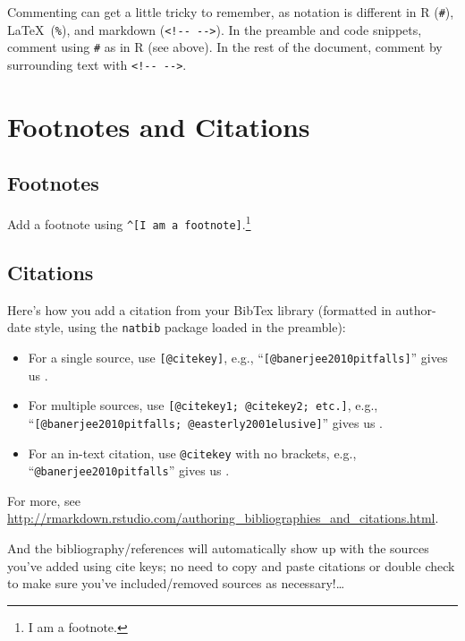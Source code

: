\documentclass[11pt,]{article}
\providecommand{\tightlist}{%
  \setlength{\itemsep}{0pt}\setlength{\parskip}{0pt}}
\let\rmarkdownfootnote\footnote%
\def\footnote{\protect\rmarkdownfootnote}
\begin{document}
Commenting can get a little tricky to remember, as notation is different
in R (\texttt{\#}), \LaTeX~(\texttt{\%}), and markdown
(\texttt{\textless{}!-\/-\ -\/-\textgreater{}}). In the preamble and
code snippets, comment using \texttt{\#} as in R (see above). In the
rest of the document, comment by surrounding text with
\texttt{\textless{}!-\/-\ -\/-\textgreater{}}.

\section{Footnotes and Citations}\label{footnotes-and-citations}

\subsection{Footnotes}\label{footnotes}

Add a footnote using \texttt{\^{}{[}I\ am\ a\ footnote{]}}.\footnote{I
  am a footnote.}

\subsection{Citations}\label{citations}

Here's how you add a citation from your BibTex library (formatted in
author-date style, using the \texttt{natbib} package loaded in the
preamble):

\begin{itemize}
\tightlist
\item
  For a single source, use \texttt{{[}@citekey{]}}, e.g.,
  ``\texttt{{[}@banerjee2010pitfalls{]}}'' gives us
  \citep{banerjee2010pitfalls}.
\item
  For multiple sources, use \texttt{{[}@citekey1;\ @citekey2;\ etc.{]}},
  e.g., ``\texttt{{[}@banerjee2010pitfalls;\ @easterly2001elusive{]}}''
  gives us \citep{banerjee2010pitfalls, easterly2001elusive}.
\item
  For an in-text citation, use \texttt{@citekey} with no brackets, e.g.,
  ``\texttt{@banerjee2010pitfalls}'' gives us
  \citet{banerjee2010pitfalls}.
\end{itemize}

For more, see
\url{http://rmarkdown.rstudio.com/authoring_bibliographies_and_citations.html}.

And the bibliography/references will automatically show up with the
sources you've added using cite keys; no need to copy and paste
citations or double check to make sure you've included/removed sources
as necessary!\ldots{}


\end{document}
